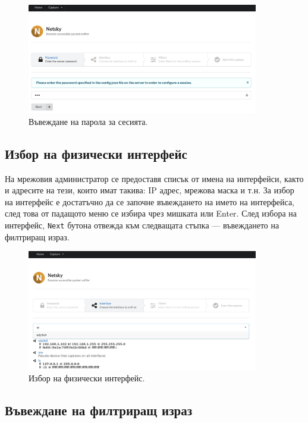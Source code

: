 \documentclass[12pt,a4paper,oneside]{book}
\begin{document}
\begin{figure}[h!]
  \centering
  \includegraphics[width=0.9\textwidth]{figures/screenshots/password.png}
  \caption{Въвеждане на парола за сесията.}
  \label{screenshots_password_fig}
\end{figure}

\subsection{Избор на физически интерфейс}

На мрежовия администратор се предоставя списък от имена на интерфейси, както и
адресите на тези, които имат такива: IP адрес, мрежова маска и т.н. За избор на
интерфейс е достатъчно да се започне въвеждането на името на интерфейса, след
това от падащото меню се избира чрез мишката или Enter. След избора на интерфейс,
\texttt{Next} бутона отвежда към следващата стъпка ---
въвеждането на филтриращ израз.

\begin{figure}[h!]
  \centering
  \includegraphics[width=0.9\textwidth]{figures/screenshots/interface.png}
  \caption{Избор на физически интерфейс.}
  \label{screenshots_interface_fig}
\end{figure}

\subsection{Въвеждане на филтриращ израз}
\end{document}
